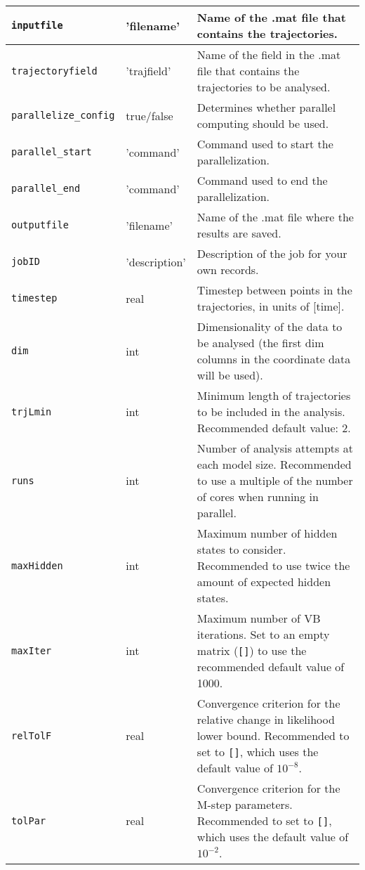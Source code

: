 \begin{longtable}{|m{}|>{\centering\arraybackslash}m{}|m{}|}
\texttt{inputfile}						&	  'filename'						&		Name of the .mat file that contains the trajectories.\\ [0.5ex]  \hline 
\texttt{trajectoryfield}				&	  'trajfield'							&		Name of the field in the .mat file that contains the trajectories to be analysed.\\ [0.5ex]  \hline 
\texttt{parallelize\_config}		&	  true/false						&		Determines whether parallel computing should be used.\\ [0.5ex]  \hline 
\texttt{parallel\_start}				&	  'command'						&		Command used to start the parallelization.\\ [0.5ex]  \hline 
\texttt{parallel\_end}				&	  'command'						&		Command used to end the parallelization.\\ [0.5ex]  \hline 
\texttt{outputfile	}					&	  'filename'						&		Name of the .mat file where the results are saved.\\ [0.5ex]  \hline 
\texttt{jobID}							&	  'description'					&		Description of the job for your own records.\\ [0.5ex]  \hline 
\texttt{timestep}						&	  real								&		Timestep between points in the trajectories, in units of [time].\\ [0.5ex]  \hline 
\texttt{dim}								&	  int							&		Dimensionality of the data to be analysed (the first dim columns in the coordinate data will be used).\\ [0.5ex]  \hline 
\texttt{trjLmin}						&	  int									&		Minimum length of trajectories to be included in the analysis. Recommended default value: 2.\\ [0.5ex]  \hline 
\texttt{runs}							&	  int								&		Number of analysis attempts at each model size. Recommended to use a multiple of the number of cores when running in parallel.\\ [0.5ex]  \hline 
\texttt{maxHidden}					&	  int								&		Maximum number of hidden states to consider. Recommended to use twice the amount of expected hidden states.\\ [0.5ex]  \hline 
\texttt{maxIter}						&	  int									&		Maximum number of VB iterations. Set to an empty matrix (\texttt{[]}) to use the recommended default value of 1000.\\ [0.5ex]  \hline 
\texttt{relTolF}						&	  real									&		Convergence criterion for the relative change in likelihood lower bound. Recommended to set to \texttt{[]}, which uses the default value of $10^{-8}$.\\[0.5ex]  \hline 
\texttt{tolPar}							&	  real									&		Convergence criterion for the M-step parameters. Recommended to set to \texttt{[]}, which uses the default value of $10^{-2}$.\\[0.5ex]  \hline 

\end{longtable}
